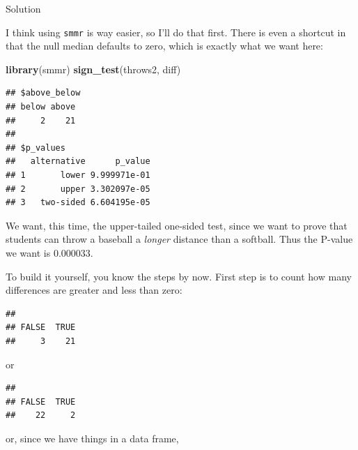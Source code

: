 \documentclass[]{tufte-book}
\newenvironment{Shaded}{}{}
\newcommand{\DecValTok}[1]{\textcolor[rgb]{0.25,0.63,0.44}{#1}}
\newcommand{\KeywordTok}[1]{\textcolor[rgb]{0.00,0.44,0.13}{\textbf{#1}}}
\newcommand{\NormalTok}[1]{#1}
\newcommand{\OperatorTok}[1]{\textcolor[rgb]{0.40,0.40,0.40}{#1}}
\newcommand{\StringTok}[1]{\textcolor[rgb]{0.25,0.44,0.63}{#1}}
\theoremstyle{definition}
\theoremstyle{definition}
\theoremstyle{definition}
\theoremstyle{remark}
\begin{document}
Solution

I think using \texttt{smmr} is way easier, so I'll do that first. There
is even a shortcut in that the null median defaults to zero, which is
exactly what we want here:

\begin{Shaded}
\begin{Highlighting}[]
\KeywordTok{library}\NormalTok{(smmr)}
\KeywordTok{sign_test}\NormalTok{(throws2, diff)}
\end{Highlighting}
\end{Shaded}

\begin{verbatim}
## $above_below
## below above 
##     2    21 
## 
## $p_values
##   alternative      p_value
## 1       lower 9.999971e-01
## 2       upper 3.302097e-05
## 3   two-sided 6.604195e-05
\end{verbatim}

We want, this time, the upper-tailed one-sided test, since we want to
prove that students can throw a baseball a \emph{longer} distance than a
softball. Thus the P-value we want is 0.000033.

To build it yourself, you know the steps by now. First step is to count
how many differences are greater and less than zero:

\begin{Shaded}
\end{Shaded}

\begin{verbatim}
## 
## FALSE  TRUE 
##     3    21
\end{verbatim}

or

\begin{Shaded}
\end{Shaded}

\begin{verbatim}
## 
## FALSE  TRUE 
##    22     2
\end{verbatim}

or, since we have things in a data frame,
\end{document}
